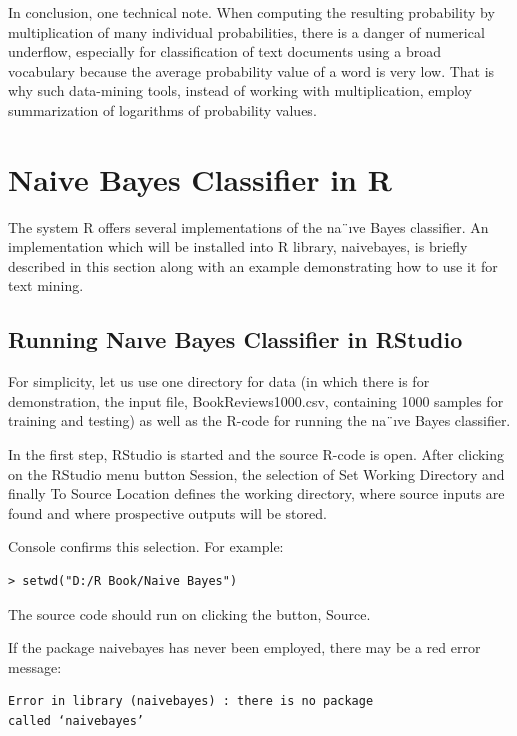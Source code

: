In conclusion, one technical note. When computing the resulting probability
by multiplication of many individual probabilities, there is a danger of numerical
underflow, especially for classification of text documents using a broad vocabulary because the average probability value of a word is very low. That is why
such data-mining tools, instead of working with multiplication, employ summarization of logarithms of probability values.

\section{Naive Bayes Classifier in R}

The system R offers several implementations of the na¨ıve Bayes classifier. An
implementation which will be installed into R library, naivebayes, is briefly described in this section along with an example demonstrating how to use it for
text mining.

\subsection{Running Naıve Bayes Classifier in RStudio}

For simplicity, let us use one directory for data (in which there is for demonstration, the input file, BookReviews1000.csv, containing 1000 samples for training
and testing) as well as the R-code for running the na¨ıve Bayes classifier.

In the first step, RStudio is started and the source R-code is open. After clicking on the RStudio menu button Session, the selection of Set Working Directory
and finally To Source Location defines the working directory, where source inputs are found and where prospective outputs will be stored.

Console confirms this selection. For example:

\begin{verbatim}
> setwd("D:/R Book/Naive Bayes")
\end{verbatim}

The source code should run on clicking the button, Source.

If the package naivebayes has never been employed, there may be a red
error message:

\begin{verbatim}
Error in library (naivebayes) : there is no package
called ‘naivebayes’
\end{verbatim}

